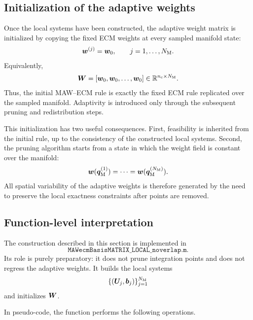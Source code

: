 \documentclass[11pt,a4paper]{article}
\begin{document}
\subsection{Initialization of the adaptive weights}

Once the local systems have been constructed, the adaptive weight matrix is
initialized by copying the fixed ECM weights at every sampled manifold state:
\[
        \bm w^{(j)} = \bm w_{0},
        \qquad
        j=1,\ldots,N_{\mathrm{M}}.
\]
Equivalently,
\[
        \bm W
        =
        [\bm w_{0},\bm w_{0},\ldots,\bm w_{0}]
        \in\mathbb{R}^{n_{\mathrm{c}}\times N_{\mathrm{M}}}.
\]
Thus, the initial MAW--ECM rule is exactly the fixed ECM rule replicated over
the sampled manifold. Adaptivity is introduced only through the subsequent
pruning and redistribution steps.

This initialization has two useful consequences. First, feasibility is inherited
from the initial rule, up to the consistency of the constructed local systems.
Second, the pruning algorithm starts from a state in which the weight field is
constant over the manifold:
\[
        \bm w(\bm q_{\mathrm{M}}^{(1)})
        =
        \cdots
        =
        \bm w(\bm q_{\mathrm{M}}^{(N_{\mathrm{M}})}).
\]
All spatial variability of the adaptive weights is therefore generated by the
need to preserve the local exactness constraints after points are removed.

\subsection{Function-level interpretation}

The construction described in this section is implemented in
\[
        \texttt{MAWecmBasisMATRIX\_LOCAL\_noverlap.m}.
\]
Its role is purely preparatory: it does not prune integration points and does
not regress the adaptive weights. It builds the local systems
\[
        \{(\bm U_j,\bm b_j)\}_{j=1}^{N_{\mathrm{M}}}
\]
and initializes $\bm W$.

In pseudo-code, the function performs the following operations.
\end{document}
